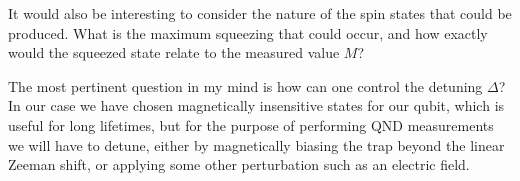 \documentclass{article}
\begin{document}
It would also be interesting to consider the nature of the spin states that
could be produced. What is the maximum squeezing that could occur, and how
exactly would the squeezed state relate to the measured value $M$?

The most pertinent question in my mind is how can one control the detuning
$\Delta$? In our case we have chosen magnetically insensitive states for our
qubit, which is useful for long lifetimes, but for the purpose of performing
QND measurements we will have to detune, either by magnetically biasing the
trap beyond the linear Zeeman shift, or applying some other perturbation
such as an electric field.

%
%

\printbibliography
\end{document}

